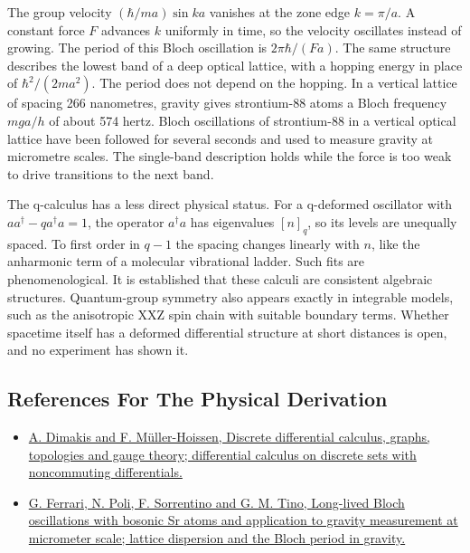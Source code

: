 \documentclass[11pt,oneside]{book}
\begin{document}
The group velocity \((\hbar/ma)\sin ka\) vanishes at the zone edge \(k=\pi/a\). A constant force \(F\) advances \(k\) uniformly in time, so the velocity oscillates instead of growing. The period of this Bloch oscillation is \(2\pi\hbar/(Fa)\). The same structure describes the lowest band of a deep optical lattice, with a hopping energy in place of \(\hbar^2/(2ma^2)\). The period does not depend on the hopping. In a vertical lattice of spacing 266 nanometres, gravity gives strontium-88 atoms a Bloch frequency \(mga/h\) of about 574 hertz. Bloch oscillations of strontium-88 in a vertical optical lattice have been followed for several seconds and used to measure gravity at micrometre scales. The single-band description holds while the force is too weak to drive transitions to the next band.

The q-calculus has a less direct physical status. For a q-deformed oscillator with \(aa^\dagger-qa^\dagger a=1\), the operator \(a^\dagger a\) has eigenvalues \([n]_q\), so its levels are unequally spaced. To first order in \(q-1\) the spacing changes linearly with \(n\), like the anharmonic term of a molecular vibrational ladder. Such fits are phenomenological. It is established that these calculi are consistent algebraic structures. Quantum-group symmetry also appears exactly in integrable models, such as the anisotropic XXZ spin chain with suitable boundary terms. Whether spacetime itself has a deformed differential structure at short distances is open, and no experiment has shown it.

\subsection*{References For The Physical Derivation}
\begin{itemize}
\item \href{https://arxiv.org/abs/hep-th/9404112}{A. Dimakis and F. Müller-Hoissen, Discrete differential calculus, graphs, topologies and gauge theory; differential calculus on discrete sets with noncommuting differentials.}
\item \href{https://arxiv.org/abs/physics/0605018}{G. Ferrari, N. Poli, F. Sorrentino and G. M. Tino, Long-lived Bloch oscillations with bosonic Sr atoms and application to gravity measurement at micrometer scale; lattice dispersion and the Bloch period in gravity.}
\end{itemize}





\clearpage
\end{document}
